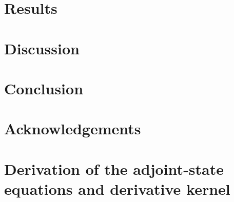 \documentclass[twocolumn, switch]{article} %
\begin{document}
\section{Results}


\section{Discussion}


\section{Conclusion}



\section*{Acknowledgements}

\normalsize


\appendix

\section{Derivation of the adjoint-state equations and derivative kernel}

\end{document}
